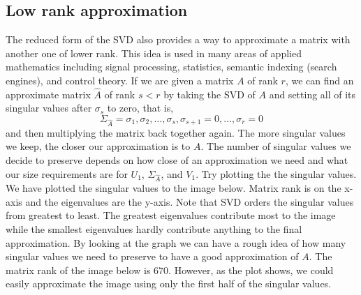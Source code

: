 \subsection*{Low rank approximation}
The reduced form of the SVD also provides a way to approximate a
matrix with another one of lower rank.
This idea is used in many areas of applied mathematics including signal processing, statistics, semantic indexing (search engines), and control theory.
If we are given a matrix $A$ of rank $r$, we can find an approximate matrix $\widehat A$ of rank $s<r$ by taking the SVD of $A$ and setting all of its singular values after $\sigma_s$ to zero, that is,
\begin{equation*}
\Sigma_{\widehat A} = \sigma_1, \sigma_2, \ldots, \sigma_s,\sigma_{s+1}=0,\ldots,\sigma_r=0
\end{equation*}
and then multiplying the matrix back together again.
The more singular values we keep, the closer our approximation is to $A$.
The number of singular values we decide to preserve depends on how close of an approximation we need and what our size requirements are for $U_1$, $\Sigma_{\widehat A}$, and $V_1$.
Try plotting the the singular values.
We have plotted the singular values to the image below.
Matrix rank is on the x-axis and the eigenvalues are the y-axis.
Note that SVD orders the singular values from greatest to least.
The greatest eigenvalues contribute most to the image while the smallest eigenvalues hardly contribute anything to the final approximation.
By looking at the graph we can have a rough idea of how many singular values we need to preserve to have a good approximation of $A$.
The matrix rank of the image below is $670$.
However, as the plot shows, we could easily approximate the image using only the first half of the singular values.


